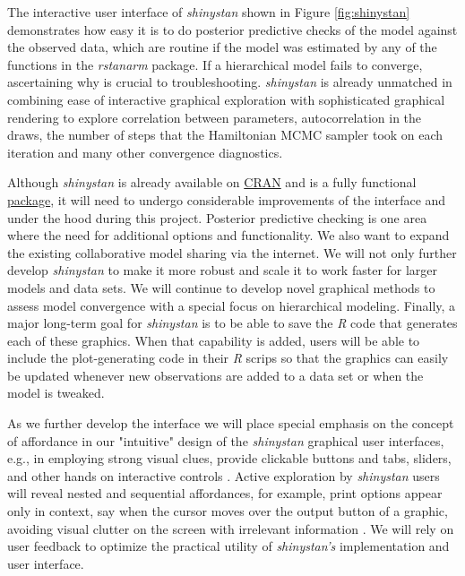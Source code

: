 \documentclass[11pt,notitlepage]{article}
\begin{document}
The interactive user interface of \textit{shinystan} shown in Figure \ref{fig:shinystan} 
demonstrates how easy it is to do posterior predictive checks of the model against the
observed data, which are routine if the model was estimated by any of the
functions in the \textit{rstanarm} package. If a hierarchical 
model fails to converge, ascertaining why is crucial to troubleshooting. \textit{shinystan} 
is already unmatched in combining ease of interactive graphical exploration 
with sophisticated graphical rendering to explore correlation between parameters, autocorrelation
in the draws, the number of steps that the Hamiltonian MCMC sampler took on each iteration and 
many other convergence diagnostics.

Although \textit{shinystan} is already available on \href{https://cran.r-project.org/web/packages/shinystan/index.html}{CRAN} 
and is a fully functional \href{https://www.youtube.com/watch?v=X31xqNHcvQs}{package}, it
will need to undergo considerable improvements of the interface and under the hood during this project. Posterior predictive 
checking is one area where the need for additional options and functionality. We also want to expand the existing collaborative 
model sharing via the internet. We will not only further develop \textit{shinystan} 
to make it more robust and scale it to work faster for larger models and data sets. We will continue to develop novel graphical 
methods to assess model convergence with a special focus on hierarchical modeling. Finally, a
major long-term goal for \textit{shinystan} is to be able to save the \textit{R} code that 
generates each of these graphics. When that capability is added, users will be able to
include the plot-generating code in their \textit{R} scrips so that the graphics can 
easily be updated whenever new observations are added to a data set or when the model is tweaked.

As we further develop the interface we will place special emphasis on the concept of affordance in our "intuitive" 
design of the \textit{shinystan} graphical user interfaces, e.g., in employing strong visual clues, provide clickable buttons and tabs, sliders, and other 
hands on interactive controls \cite{NormanAffordances1999}. Active exploration by \textit{shinystan} users will reveal nested and sequential 
affordances, for example, print options appear only in context, say when the cursor moves over the output button of a graphic, 
avoiding visual clutter on the screen with irrelevant information \cite{Mcgrenere2000affordances}. We will rely on user 
feedback to optimize the practical utility of \textit{shinystan's} implementation and user interface.
\end{document}
